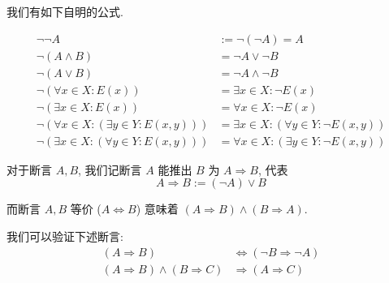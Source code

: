 我们有如下自明的公式.

\begin{theorem}
    \begin{align}
        \neg \neg A &:= \neg (\neg A) = A \\
        \neg (A \wedge B) &= \neg A \vee \neg B \\
        \neg (A \vee B) &= \neg A \wedge \neg B \\
        \neg (\forall x \in X : E(x)) &= \exists x \in X : \neg E(x) \\
        \neg (\exists x \in X : E(x)) &= \forall x \in X : \neg E(x) \\
        \neg (\forall x \in X : (\exists y \in Y : E(x, y))) &= \exists x \in X : (\forall y \in Y : \neg E(x, y)) \\
        \neg (\exists x \in X : (\forall y \in Y : E(x, y))) &= \forall x \in X : (\exists y \in Y : \neg E(x, y))
    \end{align}
\end{theorem}

\begin{definition}
    对于断言 \(A, B\), 我们记断言 \(A\) 能推出 \(B\) 为 \(A \Rightarrow B\), 代表
    \begin{equation}
        A \Rightarrow B := (\neg A) \vee B
    \end{equation}

    而断言 \(A, B\) 等价 (\(A \Leftrightarrow B\)) 意味着 \((A \Rightarrow B) \wedge (B \Rightarrow A)\).
\end{definition}

\begin{theorem}
    我们可以验证下述断言:
    \begin{align}
        (A \Rightarrow B) &\Leftrightarrow (\neg B \Rightarrow \neg A) \\
        (A \Rightarrow B) \wedge (B \Rightarrow C) &\Rightarrow (A \Rightarrow C)
    \end{align}
\end{theorem}
